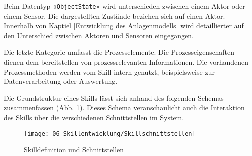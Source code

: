 	 \begin{bfhNoteBox}
	 	Beim Datentyp «\verb|ObjectState|» wird unterschieden zwischen einem Aktor oder einem Sensor. Die dargestellten Zustände beziehen sich auf einen Aktor. Innerhalb von Kaptiel \ref{Entwicklung des Anlagenmodells} wird detaillierter auf den Unterschied zwischen Aktoren und Sensoren eingegangen. 
	 \end{bfhNoteBox}
	 \vspace{3mm}
	 
	 Die letzte Kategorie umfasst die Prozesselemente. Die Prozesseigenschaften dienen dem bereitstellen von prozessrelevanten Informationen. Die vorhandenen Prozessmethoden werden vom Skill intern genutzt, beispielsweise zur Datenverarbeitung oder  Auswertung.
	 
	 \newpage
	 
	 Die Grundstruktur eines Skills lässt sich anhand des folgenden Schemas zusammenfassen (Abb. \ref{fig:Skillschnittstellen}). Dieses Schema veranschaulicht auch die Interaktion des Skills über die verschiedenen Schnittstellen im System.
	 \\
	 \begin{figure}[h!]
	 	\centering
	 	\texttt{[image: 06\_Skillentwicklung/Skillschnittstellen]}
	 	\captionsetup{justification=centering}
	 	\caption{Skilldefinition und Schnittstellen}
	 	\label{fig:Skillschnittstellen}
	 \end{figure}
	 
	 \newpage
	 
	 